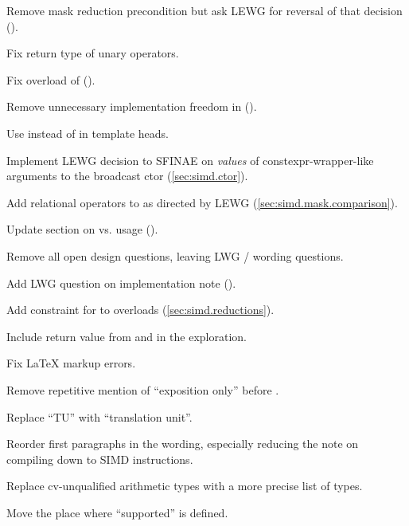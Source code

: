 \begin{revision}
\item Remove mask reduction precondition but ask LEWG for reversal of that decision ().
\item Fix return type of \mask unary operators.
\item Fix  overload of \simdselect ().
\item Remove unnecessary implementation freedom in  ().
\item Use  instead of  in template heads.
\item Implement LEWG decision to SFINAE on \emph{values} of
  constexpr-wrapper-like arguments to the broadcast ctor (\ref{sec:simd.ctor}).
\item Add relational operators to \mask as directed by LEWG (\ref{sec:simd.mask.comparison}).
\item Update section on  vs.  usage ().
\item Remove all open design questions, leaving LWG / wording questions.
\item Add LWG question on implementation note ().
\item Add constraint for  to  overloads (\ref{sec:simd.reductions}).
\end{revision}

\begin{revision}
\item Include  return value from  and  in the exploration.
\item Fix \LaTeX{} markup errors.
\item Remove repetitive mention of “exposition only” before \deducet.
\item Replace “TU” with “translation unit”.
\item Reorder first paragraphs in the wording, especially reducing the note on compiling down to SIMD instructions.
\item Replace cv-unqualified arithmetic types with a more precise list of types.
\item Move the place where “supported” is defined.
\end{revision}

